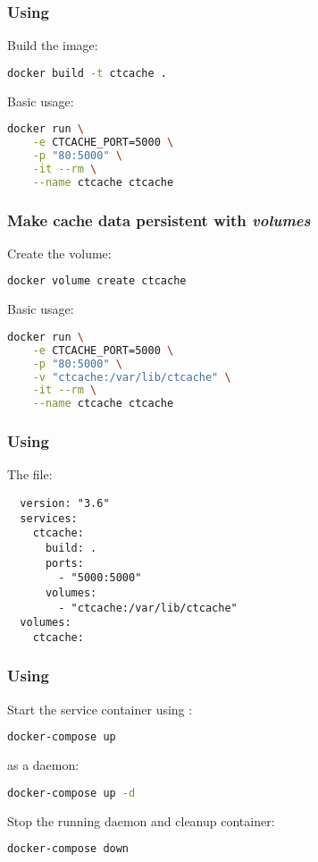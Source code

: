 \documentclass[compress,table,xcolor=table]{beamer}
\begin{document}
\begin{frame}[fragile]
  \frametitle{Using }
  \LARGE
  Build the image:
  \begin{lstlisting}[language=bash]
  docker build -t ctcache .
  \end{lstlisting}
  Basic usage:
  \begin{lstlisting}[language=bash]
  docker run \
    -e CTCACHE_PORT=5000 \
    -p "80:5000" \
    -it --rm \
    --name ctcache ctcache
  \end{lstlisting}
\end{frame}
\begin{frame}[fragile]
  \frametitle{Make cache data persistent with  {\em volumes}}
  \LARGE
  Create the volume:
  \begin{lstlisting}[language=bash]
  docker volume create ctcache
  \end{lstlisting}
  Basic usage:
  \begin{lstlisting}[language=bash]
  docker run \
    -e CTCACHE_PORT=5000 \
    -p "80:5000" \
    -v "ctcache:/var/lib/ctcache" \
    -it --rm \
    --name ctcache ctcache
  \end{lstlisting}
\end{frame}
\begin{frame}[fragile]
  \frametitle{Using }
  \LARGE
  The  file:
  \begin{lstlisting}
  version: "3.6"
  services:
    ctcache:
      build: .
      ports:
        - "5000:5000"
      volumes:
        - "ctcache:/var/lib/ctcache"
  volumes:
    ctcache:
  \end{lstlisting}
\end{frame}
\begin{frame}[fragile]
  \frametitle{Using }
  \Large
  Start the service container using :
  \begin{lstlisting}[language=bash]
  docker-compose up
  \end{lstlisting}
  as a daemon:
  \begin{lstlisting}[language=bash]
  docker-compose up -d
  \end{lstlisting}
  Stop the running daemon and cleanup container:
  \begin{lstlisting}[language=bash]
  docker-compose down
  \end{lstlisting}
\end{frame}
\end{document}
